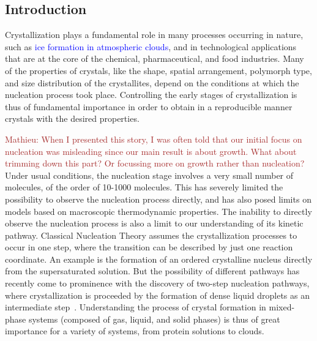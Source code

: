 \documentclass[preprint,amsmath,amssymb,superscriptaddress]{revtex4-1}
\begin{document}
\maketitle

\subsection{Introduction}

Crystallization plays a fundamental role in many processes occurring in nature, such as \textcolor{blue}{ice formation in atmospheric clouds}, and in technological applications
that are at the core of the chemical, pharmaceutical, and food industries.
Many of the properties of crystals, like the shape, spatial arrangement, polymorph type, and size distribution of the crystallites, depend on the conditions at which
the nucleation process took place. Controlling the early stages of crystallization is thus of fundamental importance in order to
obtain in a reproducible manner crystals with the desired properties. 

\textcolor{brown}{Mathieu: When I presented this story, I was often told that our initial focus on nucleation was misleading since our main result is about growth. What about trimming down this part? Or focussing more on growth rather than nucleation? }Under usual conditions, the nucleation stage involves a very small number of molecules, of the order of 10-1000 molecules.
This has severely limited the possibility to observe the nucleation process directly, and has also posed limits on
models based on macroscopic thermodynamic properties. 
The inability to directly observe the nucleation process is also a limit to our understanding of its kinetic pathway. 
Classical Nucleation Theory assumes the crystallization processes to occur in one step,
where the transition can be described by just one reaction coordinate. An example is the formation of an ordered crystalline nucleus
directly from the supersaturated solution. But the possibility of different pathways has recently come to prominence with
the discovery of two-step nucleation pathways, where crystallization is proceeded by the formation of dense liquid  droplets as an intermediate step~\cite{ten1997enhancement,SearR,savage2009experimental,vekilov2010two,palberg2014crystallization}.
Understanding the process of crystal formation in mixed-phase systems (composed of gas, liquid, and solid phases) is thus
of great importance for a variety of systems, from protein solutions to clouds. 
\end{document}
